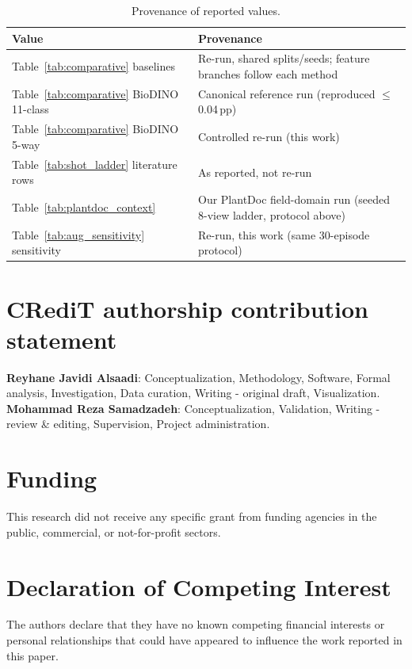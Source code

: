 \documentclass[preprint,12pt]{elsarticle}
\begin{document}
\begin{table}[htbp]
\caption{Provenance of reported values.}
\label{tab:provenance}
\centering

\footnotesize
\begin{tabularx}{\columnwidth}{l X}
\toprule
\textbf{Value} & \textbf{Provenance} \\
\midrule
Table~\ref{tab:comparative} baselines & Re-run, shared splits/seeds; feature branches follow each method \\
Table~\ref{tab:comparative} BioDINO 11-class & Canonical reference run (reproduced $\le$0.04\,pp) \\
Table~\ref{tab:comparative} BioDINO 5-way & Controlled re-run (this work) \\
Table~\ref{tab:shot_ladder} literature rows & As reported, not re-run \\
Table~\ref{tab:plantdoc_context} & Our PlantDoc field-domain run (seeded 8-view ladder, protocol above) \\
Table~\ref{tab:aug_sensitivity} sensitivity & Re-run, this work (same 30-episode protocol) \\
\bottomrule
\end{tabularx}
\end{table}



\section*{CRediT authorship contribution statement}
\textbf{Reyhane Javidi Alsaadi}: Conceptualization, Methodology, Software, Formal analysis, Investigation, Data curation, Writing - original draft, Visualization.
\textbf{Mohammad Reza Samadzadeh}: Conceptualization, Validation, Writing - review \& editing, Supervision, Project administration.

\section*{Funding}
This research did not receive any specific grant from funding agencies in the public, commercial, or not-for-profit sectors.

\section*{Declaration of Competing Interest}
The authors declare that they have no known competing financial interests or personal relationships that could have appeared to influence the work reported in this paper.
\end{document}
